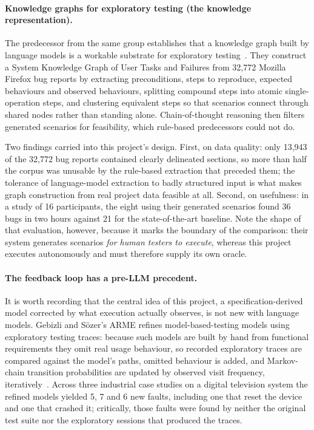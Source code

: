\paragraph{Knowledge graphs for exploratory testing (the knowledge
representation).} The predecessor from the same group establishes that a
knowledge graph built by language models is a workable substrate for
exploratory testing~\cite{etkg}. They construct a System Knowledge Graph of
User Tasks and Failures from 32,772 Mozilla Firefox bug reports by extracting
preconditions, steps to reproduce, expected behaviours and observed behaviours,
splitting compound steps into atomic single-operation steps, and clustering
equivalent steps so that scenarios connect through shared nodes rather than
standing alone. Chain-of-thought reasoning then filters generated scenarios for
feasibility, which rule-based predecessors could not do.

Two findings carried into this project's design. First, on data quality: only
13,943 of the 32,772 bug reports contained clearly delineated sections, so more
than half the corpus was unusable by the rule-based extraction that preceded
them; the tolerance of language-model extraction to badly structured input is
what makes graph construction from real project data feasible at all. Second,
on usefulness: in a study of 16 participants, the eight using their generated
scenarios found 36 bugs in two hours against 21 for the state-of-the-art
baseline. Note the shape of that evaluation, however, because it marks the
boundary of the comparison: their system generates scenarios \emph{for human
testers to execute}, whereas this project executes autonomously and must
therefore supply its own oracle.

\paragraph{The feedback loop has a pre-LLM precedent.} It is worth recording
that the central idea of this project, a specification-derived model corrected
by what execution actually observes, is not new with language models. Gebizli
and S\"ozer's ARME refines model-based-testing models using exploratory testing
traces: because such models are built by hand from functional requirements they
omit real usage behaviour, so recorded exploratory traces are compared against
the model's paths, omitted behaviour is added, and Markov-chain transition
probabilities are updated by observed visit frequency, iteratively~\cite{arme}.
Across three industrial case studies on a digital television system the refined
models yielded 5, 7 and 6 new faults, including one that reset the device and
one that crashed it; critically, those faults were found by neither the
original test suite nor the exploratory sessions that produced the traces.


